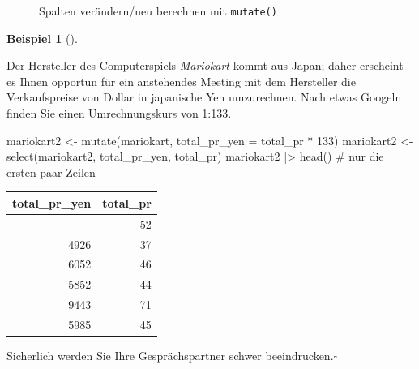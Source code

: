 \documentclass[
  a4paper,
  DIV=11]{scrreprt}
\newenvironment{Shaded}{\begin{snugshade}}{\end{snugshade}}
\newcommand{\AttributeTok}[1]{\textcolor[rgb]{0.40,0.45,0.13}{#1}}
\newcommand{\CommentTok}[1]{\textcolor[rgb]{0.37,0.37,0.37}{#1}}
\newcommand{\DecValTok}[1]{\textcolor[rgb]{0.68,0.00,0.00}{#1}}
\newcommand{\FunctionTok}[1]{\textcolor[rgb]{0.28,0.35,0.67}{#1}}
\newcommand{\NormalTok}[1]{\textcolor[rgb]{0.00,0.23,0.31}{#1}}
\newcommand{\OtherTok}[1]{\textcolor[rgb]{0.00,0.23,0.31}{#1}}
\newcommand{\SpecialCharTok}[1]{\textcolor[rgb]{0.37,0.37,0.37}{#1}}
\theoremstyle{definition}
\theoremstyle{definition}
\newtheorem{example}{Beispiel}[chapter]
\theoremstyle{definition}
\theoremstyle{remark}
\begin{document}
\begin{figure}


\caption{\label{fig-mutate}Spalten verändern/neu berechnen mit
\texttt{mutate()}}

\end{figure}%

\begin{example}[]\protect\hypertarget{exm-mutate}{}\label{exm-mutate}

Der Hersteller des Computerspiels \emph{Mariokart} kommt aus Japan;
daher erscheint es Ihnen opportun für ein anstehendes Meeting mit dem
Hersteller die Verkaufspreise von Dollar in japanische Yen umzurechnen.
Nach etwas Googeln finden Sie einen Umrechnungskurs von 1:133.

\begin{Shaded}
\begin{Highlighting}[]
\NormalTok{mariokart2 }\OtherTok{\textless{}{-}} \FunctionTok{mutate}\NormalTok{(mariokart, }\AttributeTok{total\_pr\_yen =}\NormalTok{ total\_pr }\SpecialCharTok{*} \DecValTok{133}\NormalTok{)}
\NormalTok{mariokart2 }\OtherTok{\textless{}{-}} \FunctionTok{select}\NormalTok{(mariokart2, total\_pr\_yen, total\_pr)}
\NormalTok{mariokart2 }\SpecialCharTok{|\textgreater{}} \FunctionTok{head}\NormalTok{()  }\CommentTok{\# nur die ersten paar Zeilen}
\end{Highlighting}
\end{Shaded}

\begin{longtable}[]{@{}rr@{}}
\toprule\noalign{}
total\_pr\_yen & total\_pr \\
\midrule\noalign{}
\endhead
\bottomrule\noalign{}
\endlastfoot
6856 & 52 \\
4926 & 37 \\
6052 & 46 \\
5852 & 44 \\
9443 & 71 \\
5985 & 45 \\
\end{longtable}

Sicherlich werden Sie Ihre Gesprächspartner schwer
beeindrucken.\(\square\)

\end{example}
\end{document}
